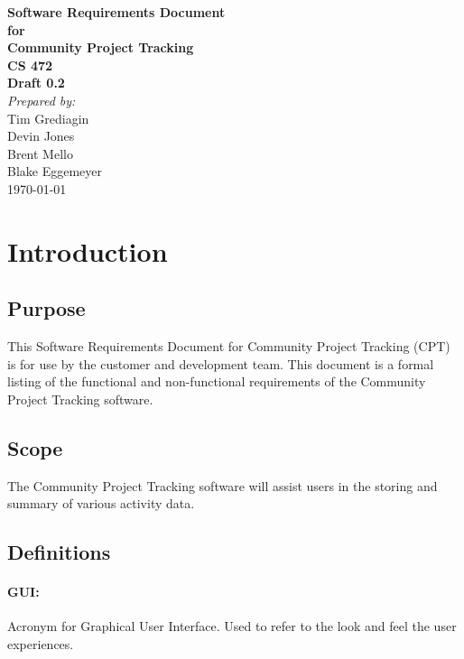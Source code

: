 \documentclass[12pt]{article}
\begin{document}
\begin{titlepage}
\begin{flushright} 
{\LARGE \bfseries Software Requirements Document}\\[1.2cm]
{\large \bfseries for}\\[1.2cm]
{\huge \bfseries Community Project Tracking}\\[1.2cm]
{\large \bfseries CS 472}\\
\vfill
{\large \bfseries Draft 0.2}\\[2cm]
\emph{Prepared by:} \\
Tim Grediagin\\
Devin Jones\\
Brent Mello\\
Blake Eggemeyer \\ [3cm]
{\large \today}
\\[2cm]
\end{flushright}
\end{titlepage}
\setcounter{tocdepth}{3}
\setcounter{secnumdepth}{4}
\tableofcontents
\newpage
\section{Introduction}

\subsection{Purpose}
This Software Requirements Document for Community Project Tracking (CPT) is for use by the customer and development team. This document is a formal listing of the functional and non-functional requirements of the Community Project Tracking software.

\subsection{Scope}
The Community Project Tracking software will assist users in the storing and summary of various activity data.

\subsection{Definitions}

\paragraph{GUI:} Acronym for Graphical User Interface. Used to refer to the look and feel the user experiences.
\end{document}
